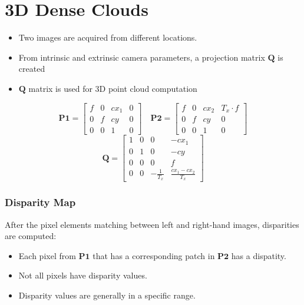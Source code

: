 \section{3D Dense Clouds}
\begin{itemize}
    \item Two images are acquired from different locations. %
    \item From intrinsic and extrinsic camera parameters, a projection matrix \(\mathbf{Q}\) is created
    \item \(\mathbf{Q}\) matrix is used for 3D point cloud computation
\end{itemize}

\[
\mathbf{P1} = 
\begin{bmatrix}
f & 0 & cx_1 & 0 \\
0 & f & cy & 0 \\
0 & 0 & 1 & 0
\end{bmatrix}
\quad
\mathbf{P2} = 
\begin{bmatrix}
f & 0 & cx_2 & T_x \cdot f \\
0 & f & cy & 0 \\
0 & 0 & 1 & 0
\end{bmatrix}
\]
\[
\mathbf{Q} = 
\begin{bmatrix}
1 & 0 & 0 & -cx_1 \\
0 & 1 & 0 & -cy \\
0 & 0 & 0 & f \\
0 & 0 & -\frac{1}{T_x} & \frac{cx_1 - cx_2}{T_x}
\end{bmatrix}
\]

\subsubsection{Disparity Map}
After the pixel elements matching between left and right-hand images, disparities are computed:
\begin{itemize}
    \item Each pixel from \(\mathbf{P1}\) that has a corresponding patch in \(\mathbf{P2}\) has a dispatity.
    \item Not all pixels have disparity values.
    \item Disparity values are generally in a specific range.
\end{itemize}
